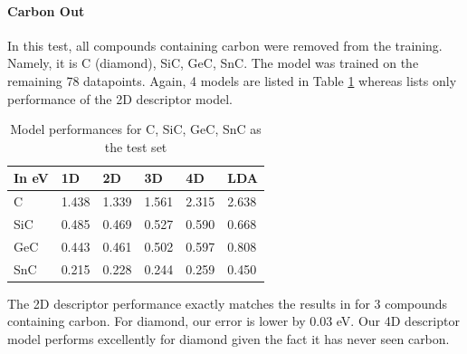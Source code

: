 \documentclass[11pt,oneside,czech,american]{book} %
\theoremstyle{plain}
\theoremstyle{definition}
\begin{document}
\paragraph{Carbon Out}
In this test, all compounds containing carbon were removed from the training. Namely, it is C (diamond), SiC, GeC, SnC. The model was trained on the remaining 78 datapoints. Again, 4 models are listed in Table \ref{carbon} whereas \parencite{ghiringhelli17} lists only performance of the 2D descriptor model.
\begin{table}[H]
	\centering
	\begin{tabular}{llllll} 
		\hline
		In eV & 1D    & 2D    & 3D    & 4D    & LDA    \\ 
		\hline
		C     & 1.438 & 1.339 & 1.561 & 2.315 & 2.638  \\ 		
		SiC   & 0.485 & 0.469 & 0.527 & 0.590 & 0.668  \\ 
		GeC   & 0.443 & 0.461 & 0.502 & 0.597 & 0.808  \\ 
		SnC   & 0.215 & 0.228 & 0.244 & 0.259 & 0.450  \\
		\hline
	\end{tabular}
	\caption{Model performances for C, SiC, GeC, SnC as the test set}
	\label{carbon}
\end{table}
The 2D descriptor performance exactly matches the results in \parencite{ghiringhelli17} for 3 compounds containing carbon. For diamond, our error is lower by 0.03 eV. Our 4D descriptor model performs excellently for diamond given the fact it has never seen carbon.

\end{document}

